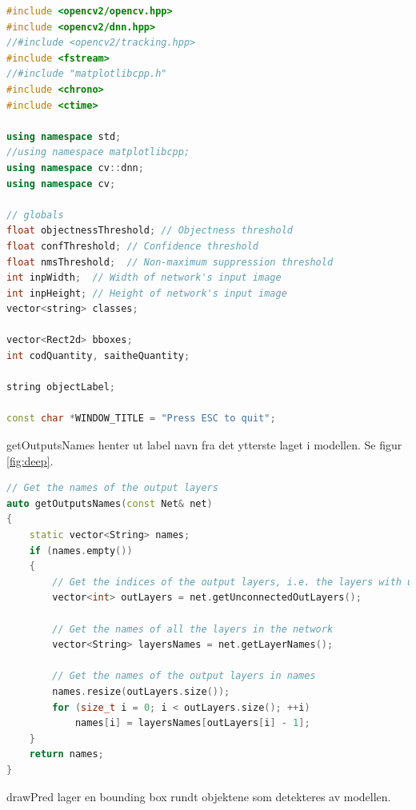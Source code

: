 \begin{lstlisting}[language=C++, caption=main.cpp]
#include <opencv2/opencv.hpp>
#include <opencv2/dnn.hpp>
//#include <opencv2/tracking.hpp>
#include <fstream>
//#include "matplotlibcpp.h"
#include <chrono>
#include <ctime>

using namespace std;
//using namespace matplotlibcpp;
using namespace cv::dnn;
using namespace cv;

// globals
float objectnessThreshold; // Objectness threshold
float confThreshold; // Confidence threshold
float nmsThreshold;  // Non-maximum suppression threshold
int inpWidth;  // Width of network's input image
int inpHeight; // Height of network's input image
vector<string> classes;

vector<Rect2d> bboxes;
int codQuantity, saitheQuantity;

string objectLabel;

const char *WINDOW_TITLE = "Press ESC to quit";
\end{lstlisting}

getOutputsNames henter ut label navn fra det ytterste laget i modellen. Se figur \ref{fig:deep}.

\begin{lstlisting}[language=C++, caption=main.cpp]
// Get the names of the output layers
auto getOutputsNames(const Net& net)
{
    static vector<String> names;
    if (names.empty())
    {
        // Get the indices of the output layers, i.e. the layers with unconnected outputs
        vector<int> outLayers = net.getUnconnectedOutLayers();

        // Get the names of all the layers in the network
        vector<String> layersNames = net.getLayerNames();

        // Get the names of the output layers in names
        names.resize(outLayers.size());
        for (size_t i = 0; i < outLayers.size(); ++i)
            names[i] = layersNames[outLayers[i] - 1];
    }
    return names;
}
\end{lstlisting}

drawPred lager en bounding box rundt objektene som detekteres av modellen.

